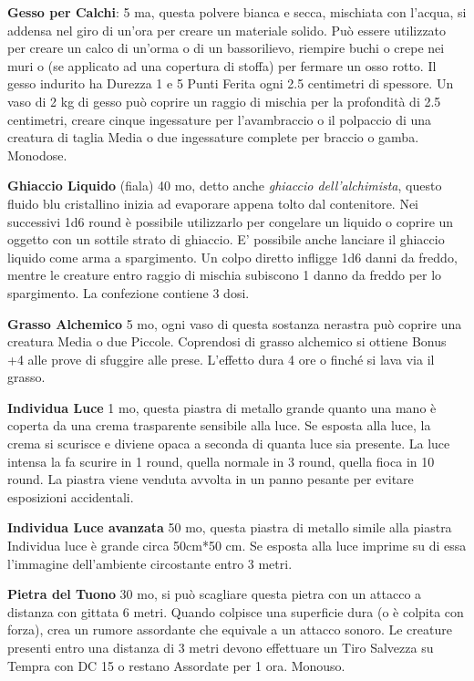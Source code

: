 \begin{multicols}{2}
\textbf{Gesso per Calchi}: 5 ma, questa polvere bianca e secca, mischiata con l'acqua, si addensa nel giro di un'ora per creare un materiale solido. Può essere utilizzato per creare un calco di un'orma o di un bassorilievo, riempire buchi o crepe nei muri o (se applicato ad una copertura di stoffa) per fermare un osso rotto. Il gesso indurito ha Durezza 1 e 5 Punti Ferita ogni 2.5 centimetri di spessore. Un vaso di 2 kg di gesso può coprire un raggio di mischia per la profondità di 2.5 centimetri, creare cinque ingessature per l'avambraccio o il polpaccio di una creatura di taglia Media o due ingessature complete per braccio o gamba. Monodose.

\textbf{Ghiaccio Liquido} (fiala) 40 mo, detto anche \emph{ghiaccio dell'alchimista}, questo fluido blu cristallino inizia ad evaporare appena tolto dal contenitore. Nei successivi 1d6 round è possibile utilizzarlo per congelare un liquido o coprire un oggetto con un sottile strato di ghiaccio. E' possibile anche lanciare il ghiaccio liquido come arma a spargimento. Un colpo diretto infligge 1d6 danni da freddo, mentre le creature entro raggio di mischia subiscono 1 danno da freddo per lo spargimento. La confezione contiene 3 dosi.

\textbf{Grasso Alchemico} 5 mo, ogni vaso di questa sostanza nerastra può coprire una creatura Media o due Piccole. Coprendosi di grasso alchemico si ottiene Bonus +4 alle prove di sfuggire alle prese. L'effetto dura 4 ore o finché si lava via il grasso.

\textbf{Individua Luce} 1 mo, questa piastra di metallo grande quanto una mano è coperta da una crema trasparente sensibile alla luce. Se esposta alla luce, la crema si scurisce e diviene opaca a seconda di quanta luce sia presente. La luce intensa la fa scurire in 1 round, quella normale in 3 round, quella fioca in 10 round.
La piastra viene venduta avvolta in un panno pesante per evitare esposizioni accidentali.

\textbf{Individua Luce avanzata} 50 mo, questa piastra di metallo simile alla piastra Individua luce è grande circa 50cm*50 cm. Se esposta alla luce imprime su di essa l'immagine dell'ambiente circostante entro 3 metri.

\textbf{Pietra del Tuono} 30 mo, si può scagliare questa pietra con un attacco a distanza con gittata 6 metri. Quando colpisce una superficie dura (o è colpita con forza), crea un rumore assordante che equivale a un attacco sonoro. Le creature presenti entro una distanza di 3 metri devono effettuare un Tiro Salvezza su Tempra con DC 15 o restano Assordate per 1 ora. Monouso.


\end{multicols}

